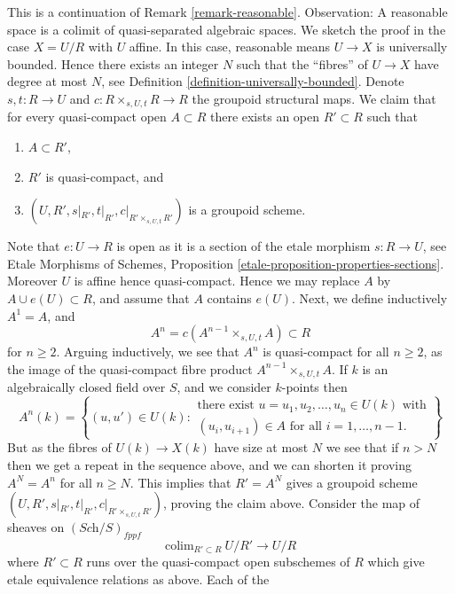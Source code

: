 \begin{remark}
\label{remark-fun-property-reasonable}
This is a continuation of Remark \ref{remark-reasonable}.
Observation: A reasonable space is a colimit of quasi-separated
algebraic spaces. We sketch the proof in the case $X = U/R$ with $U$ affine.
In this case, reasonable means $U \to X$ is universally bounded.
Hence there exists an integer $N$ such that the ``fibres'' of $U \to X$
have degree at most $N$, see Definition \ref{definition-universally-bounded}.
Denote $s, t : R \to U$ and $c : R \times_{s, U, t} R \to R$ the
groupoid structural maps.
We claim that for every quasi-compact open $A \subset R$ there exists
an open $R' \subset R$ such that
\begin{enumerate}
\item $A \subset R'$,
\item $R'$ is quasi-compact, and
\item $(U, R', s|_{R'}, t|_{R'}, c|_{R' \times_{s, U, t} R'})$ is
a groupoid scheme.
\end{enumerate}
Note that $e : U \to R$ is open as it is a section of the etale morphism
$s : R \to U$, see
Etale Morphisms of Schemes,
Proposition \ref{etale-proposition-properties-sections}. Moreover
$U$ is affine hence quasi-compact. Hence we may replace $A$ by
$A \cup e(U) \subset R$, and assume that $A$ contains $e(U)$. Next, we
define inductively $A^1 = A$, and
$$
A^n = c(A^{n - 1} \times_{s, U, t} A) \subset R
$$
for $n \geq 2$. Arguing inductively, we see that $A^n$ is quasi-compact for
all $n \geq 2$, as the image of the quasi-compact fibre product
$A^{n - 1} \times_{s, U, t} A$. If $k$ is an algebraically
closed field over $S$, and we consider $k$-points then
$$
A^n(k) = \left\{(u, u') \in U(k)
:
\begin{matrix}
\text{there exist } u = u_1, u_2, \ldots, u_n \in U(k)\text{ with} \\
(u_i , u_{i + 1}) \in A \text{ for all }i = 1, \ldots, n - 1.
\end{matrix}
\right\}
$$
But as the fibres of $U(k) \to X(k)$ have size at most $N$ we see that if
$n > N$ then we get a repeat in the sequence above, and we can shorten it
proving $A^N = A^n$ for all $n \geq N$.
This implies that $R' = A^N$ gives a groupoid scheme
$(U, R', s|_{R'}, t|_{R'}, c|_{R' \times_{s, U, t} R'})$, proving the claim
above. Consider the map of sheaves on $(\textit{Sch}/S)_{fppf}$
$$
\text{colim}_{R' \subset R}\ U/R' \longrightarrow U/R
$$
where $R' \subset R$ runs over the quasi-compact open subschemes
of $R$ which give etale equivalence relations as above. Each of the

\end{remark}
